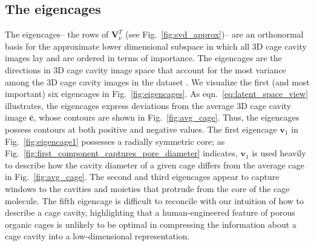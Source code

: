 \documentclass[journal=jacsat,manuscript=article,layout=traditional]{achemso}
\begin{document}
\subsection{The eigencages} The eigencages-- the rows of $\mathbf{V}_\nu^T$ (see Fig.~\ref{fig:svd_approx})-- are an orthonormal basis for the approximate lower dimensional subspace in which all 3D cage cavity images lay and are ordered in terms of importance. The eigencages are the directions in 3D cage cavity image space that account for the most variance among the 3D cage cavity images in the dataset \cite{strang1993introduction}. We visualize the first (and most important) six eigencages in Fig.~\ref{fig:eigencages}. As eqn.~\ref{eq:latent_space_view} illustrates, the eigencages express deviations from the average 3D cage cavity image $\bar{\mathbf{c}}$, whose contours are shown in Fig.~\ref{fig:avg_cage}. Thus, the eigencages possess contours at both positive and negative values. The first eigencage $\mathbf{v}_1$ in Fig.~\ref{fig:eigencage1} possesses a radially symmetric core; as Fig.~\ref{fig:first_component_captures_pore_diameter} indicates, $\mathbf{v}_1$ is used heavily to describe how the cavity diameter of a given cage differs from the average cage in Fig.~\ref{fig:avg_cage}. The second and third eigencages appear to capture windows to the cavities and moieties that protrude from the core of the cage molecule. The fifth eigencage is difficult to reconcile with our intuition of how to describe a cage cavity, highlighting that a human-engineered feature of porous organic cages is unlikely to be optimal in compressing the information about a cage cavity into a low-dimensional representation.
\end{document}
